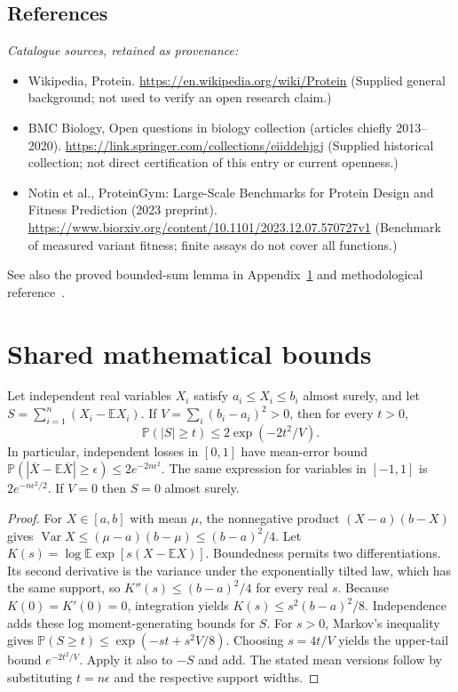\documentclass[11pt]{article}
\begin{document}
\subsection{References}
\noindent\emph{Catalogue sources, retained as provenance:}
\begin{itemize}
\item Wikipedia, Protein. \url{https://en.wikipedia.org/wiki/Protein} (Supplied general background; not used to verify an open research claim.)
\item BMC Biology, Open questions in biology collection (articles chiefly 2013--2020). \url{https://link.springer.com/collections/eiiddehjgj} (Supplied historical collection; not direct certification of this entry or current openness.)
\item Notin et al., ProteinGym: Large-Scale Benchmarks for Protein Design and Fitness Prediction (2023 preprint). \url{https://www.biorxiv.org/content/10.1101/2023.12.07.570727v1} (Benchmark of measured variant fitness; finite assays do not cover all functions.)
\end{itemize}
\noindent See also the proved bounded-sum lemma in Appendix~\ref{app:bounds} and methodological reference~\cite{hoeffding}.




\section{Shared mathematical bounds}\label{app:bounds}
\begin{lemma}\label{lem:bounded}
Let independent real variables $X_i$ satisfy $a_i\leq X_i\leq b_i$ almost surely,
and let $S=\sum_{i=1}^n(X_i-\mathbb{E} X_i)$. If
$V=\sum_i(b_i-a_i)^2>0$, then for every $t>0$,
\[
 \mathbb{P}(|S|\geq t)\leq 2\exp(-2t^2/V).
\]
In particular, independent losses in $[0,1]$ have mean-error bound
$\mathbb{P}(|\overline X-\mathbb{E}\overline X|\geq\epsilon)
\leq2e^{-2n\epsilon^2}$. The same expression for variables in $[-1,1]$
is $2e^{-n\epsilon^2/2}$. If $V=0$ then $S=0$ almost surely.
\end{lemma}
\begin{proof}
For $X\in[a,b]$ with mean $\mu$, the nonnegative product
$(X-a)(b-X)$ gives
$\operatorname{Var} X\leq(\mu-a)(b-\mu)\leq(b-a)^2/4$.
Let $K(s)=\log\mathbb{E}\exp[s(X-\mathbb{E} X)]$.
Boundedness permits two differentiations. Its second derivative is the variance
under the exponentially tilted law, which has the same support, so
$K''(s)\leq(b-a)^2/4$ for every real $s$.
Because $K(0)=K'(0)=0$, integration yields
$K(s)\leq s^2(b-a)^2/8$.
Independence adds these log moment-generating bounds for $S$.
For $s>0$, Markov's inequality gives
$\mathbb{P}(S\geq t)\leq\exp(-st+s^2V/8)$.
Choosing $s=4t/V$ yields the upper-tail bound $e^{-2t^2/V}$.
Apply it also to $-S$ and add. The stated mean versions follow by substituting
$t=n\epsilon$ and the respective support widths.
\end{proof}
\end{document}
